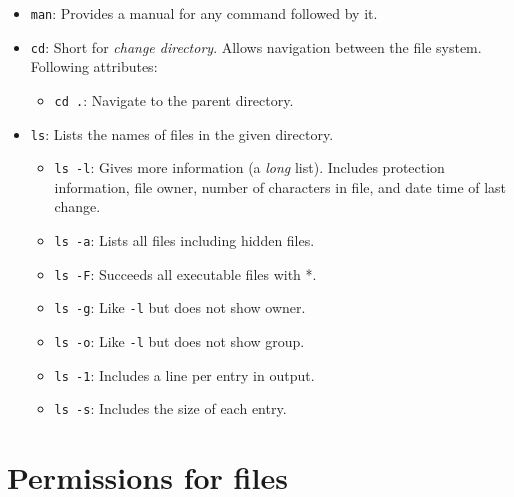 \documentclass{report}
\begin{document}
    \begin{itemize}
        \item \texttt{man}: Provides a manual for any command followed by it.
        \item \texttt{cd}: Short for \textit{change directory}. Allows navigation between the file system. Following attributes:
         \begin{itemize}
            \item \texttt{cd .}: Navigate to the parent directory.
         \end{itemize}
        \item \texttt{ls}: Lists the names of files in the given directory.
         \begin{itemize}
            \item \texttt{ls -l}: Gives more information (a \textit{long} list). Includes protection information, file owner, number of characters in file, and date time of last change.
            \item \texttt{ls -a}: Lists all files including hidden files. 
            \item \texttt{ls -F}: Succeeds all executable files with *.
            \item \texttt{ls -g}: Like \texttt{-l} but does not show owner.
            \item \texttt{ls -o}: Like \texttt{-l} but does not show group.
            \item \texttt{ls -1}: Includes a line per entry in output.
            \item \texttt{ls -s}: Includes the size of each entry.
         \end{itemize}
    \end{itemize}

    \section{Permissions for files}
\end{document}
